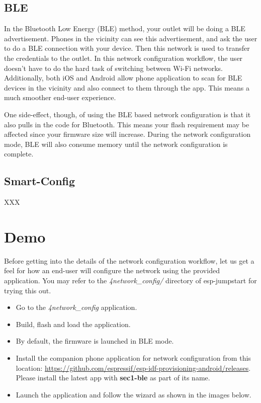 \documentclass[11pt,fleqn]{book} %
\begin{document}
\subsection{BLE}

In the Bluetooth Low Energy (BLE) method, your outlet will be doing a BLE advertisement. Phones in the vicinity can see this advertisement, and ask the user to do a BLE connection with your device. Then this network is used to transfer the credentials to the outlet.
In this network configuration workflow, the user doesn't have to do the hard task of switching between Wi-Fi networks. Additionally, both iOS and Android allow phone application to scan for BLE devices in the vicinity and also connect to them through the app. This means a much smoother end-user experience.

One side-effect, though, of using the BLE based network configuration is that it also pulls in the code for Bluetooth. This means your flash requirement may be affected since your firmware size will increase. During the network configuration mode, BLE will also consume memory until the network configuration is complete.

\subsection{Smart-Config}
XXX

\section{Demo}
Before getting into the details of the network configuration workflow, let us get a feel for how an end-user will configure the network using the provided application.
You may refer to the \textit{4network\_config/} directory of esp-jumpstart for trying this out.

\begin{itemize}
    \item Go to the \textit{4network\_config} application.
    \item Build, flash and load the application.
    \item By default, the firmware is launched in BLE mode.
    \item Install the companion phone application for network configuration from this location: \url{https://github.com/espressif/esp-idf-provisioning-android/releases}. Please install the latest app with \textbf{sec1-ble} as part of its name.
    \item Launch the application and follow the wizard as shown in the images below.
\end{itemize}
\end{document}
